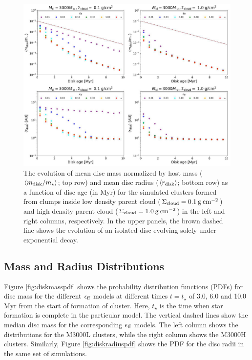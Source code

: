 \documentclass[fleqn,usenatbib]{mnras}
\newcommand\sfeff{\ensuremath{\epsilon_{\rm ff}}\xspace}   %
\begin{document}
\begin{figure}
    \centering
    \includegraphics[width=\textwidth]{figures/Panel_temporal_gradients.pdf}
    \caption{The evolution of mean disc mass normalized by host mass ($\langle m_{\rm disk}/ m_{\rm\star} \rangle$; top row) and mean disc radius ($\langle r_{\rm disk} \rangle$; bottom row) as a function of disc age (in Myr) for the simulated clusters formed from clumps inside low density parent cloud ($\Sigma_{\rm cloud}=0.1\:\rm g\:cm^{-2}$) and high density parent cloud ($\Sigma_{\rm cloud}=1.0\:\rm g\:cm^{-2}$) in the left and right columns, respectively. In the upper panels, the brown dashed line shows the evolution of an isolated disc evolving solely under exponential decay.}
    \label{fig:meandiskpropertyevolution_diskage}
\end{figure}

\subsection{Mass and Radius Distributions}
\label{subsec:PDFdiskproperties}

Figure \ref{fig:diskmasspdf} shows the probability distribution functions (PDFs) for disc mass for the different $\epsilon_{\rm ff}$ models at different times $t = t_{\star}$ of 3.0, 6.0 and 10.0 Myr from the start of formation of cluster. Here, $t_{\star}$ is the time when star formation is complete in the particular model. The vertical dashed lines show the median disc mass for the corresponding \sfeff models. The left column shows the distributions for the M3000L clusters, while the right column shows the M3000H clusters. Similarly, Figure \ref{fig:diskradiuspdf} shows the PDF for the disc radii in the same set of simulations.
\end{document}
